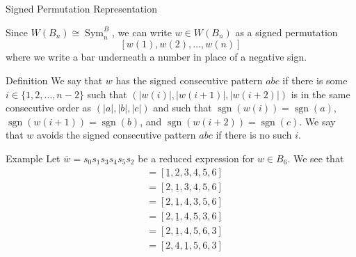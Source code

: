 \documentclass{beamer}
\newcommand{\w}{\overline{w}}
\DeclareMathOperator{\sgn}{sgn}
\DeclareMathOperator{\Sym}{Sym}
\begin{document}
\begin{frame}{Signed Permutation Representation}

Since $W(B_n) \cong \Sym_n^B$, we can write $w \in W(B_n)$ as a signed permutation 
\[[w(1), w(2), \ldots, w(n)]\] where we write a bar underneath a number in place of a negative sign.

\pause

\begin{block}{Definition}
	We say that $w$ has the \alert{signed consecutive pattern $abc$} if there is some $i \in \{1,2, \ldots, n-2\}$ such that $\left(|w(i)|, |w(i+1)|, |w(i+2)|\right)$ is in the same consecutive order as $\left(|a|, |b|, |c| \right)$ and such that $\sgn(w(i))=\sgn(a)$, $\sgn(w(i+1))=\sgn(b)$, and $\sgn(w(i+2))=\sgn(c)$. We say that $w$ \alert{avoids the signed consecutive pattern $abc$} if there is no such $i$.
\end{block}

\begin{block}{Example}
	Let $\w=s_0s_1s_3s_4s_5s_2$ be a reduced expression for $w \in B_6$. We see that
	\begin{align*}
	[1,2,3,4,5,6] &= [\underline{1},2,3,4,5,6]\\
	&=[2,\underline{1},3,4,5,6]\\	
	&=[2,\underline{1},4,3,5,6]\\
	&=[2,\underline{1},4,5,3,6]\\
	&=[2,\underline{1},4,5,6,3]\\
	&=[2,4,\underline{1},5,6,3]
	\end{align*}

\end{block}
	
\end{frame}


\end{document}
